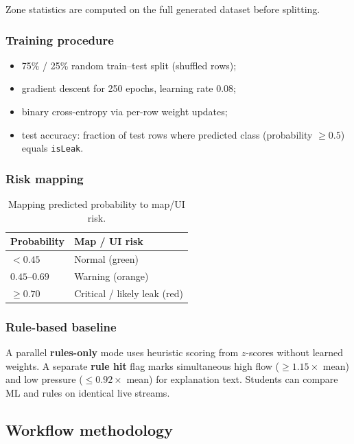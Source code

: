 \documentclass[12pt,a4paper]{article}
\begin{document}
Zone statistics are computed on the full generated dataset before splitting.

\subsubsection{Training procedure}

\begin{itemize}
    \item 75\% / 25\% random train--test split (shuffled rows);
    \item gradient descent for 250 epochs, learning rate 0.08;
    \item binary cross-entropy via per-row weight updates;
    \item test accuracy: fraction of test rows where predicted class (probability $\geq 0.5$) equals \texttt{isLeak}.
\end{itemize}

\subsubsection{Risk mapping}

\begin{table}[htbp]
\centering
\caption{Mapping predicted probability to map/UI risk.}
\label{tab:risk}
\begin{tabular}{@{}ll@{}}
\toprule
\textbf{Probability} & \textbf{Map / UI risk} \\
\midrule
$< 0.45$ & Normal (green) \\
$0.45$--$0.69$ & Warning (orange) \\
$\geq 0.70$ & Critical / likely leak (red) \\
\bottomrule
\end{tabular}
\end{table}

\subsubsection{Rule-based baseline}

A parallel \textbf{rules-only} mode uses heuristic scoring from $z$-scores without learned weights. A separate \textbf{rule hit} flag marks simultaneous high flow ($\geq 1.15 \times$ mean) and low pressure ($\leq 0.92 \times$ mean) for explanation text. Students can compare ML and rules on identical live streams.

\subsection{Workflow methodology}
\end{document}
